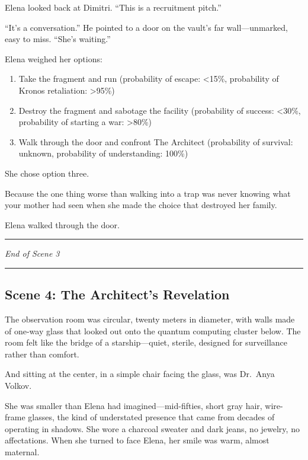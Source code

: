 \documentclass[12pt,letterpaper]{book}
\providecommand{\tightlist}{\setlength{\itemsep}{0pt}\setlength{\parskip}{0pt}}
\begin{document}
Elena looked back at Dimitri. ``This is a recruitment pitch.''

``It's a conversation.'' He pointed to a door on the vault's far wall---unmarked, easy to miss. ``She's waiting.''

Elena weighed her options:

\begin{enumerate}
\def\labelenumi{\arabic{enumi}.}
\tightlist
\item
  Take the fragment and run (probability of escape: \textless15\%, probability of Kronos retaliation: \textgreater95\%)
\item
  Destroy the fragment and sabotage the facility (probability of success: \textless30\%, probability of starting a war: \textgreater80\%)
\item
  Walk through the door and confront The Architect (probability of survival: unknown, probability of understanding: 100\%)
\end{enumerate}

She chose option three.

Because the one thing worse than walking into a trap was never knowing what your mother had seen when she made the choice that destroyed her family.

Elena walked through the door.

\begin{center}\rule{0.5\linewidth}{0.5pt}\end{center}

\emph{End of Scene 3}

\begin{center}\rule{0.5\linewidth}{0.5pt}\end{center}

\hypertarget{scene-4-the-architects-revelation}{%
\subsection{Scene 4: The Architect's Revelation}\label{scene-4-the-architects-revelation}}

The observation room was circular, twenty meters in diameter, with walls made of one-way glass that looked out onto the quantum computing cluster below. The room felt like the bridge of a starship---quiet, sterile, designed for surveillance rather than comfort.

And sitting at the center, in a simple chair facing the glass, was Dr.~Anya Volkov.

She was smaller than Elena had imagined---mid-fifties, short gray hair, wire-frame glasses, the kind of understated presence that came from decades of operating in shadows. She wore a charcoal sweater and dark jeans, no jewelry, no affectations. When she turned to face Elena, her smile was warm, almost maternal.
\end{document}
